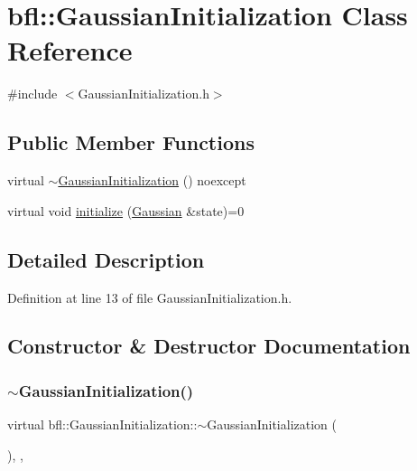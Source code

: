 \hypertarget{classbfl_1_1GaussianInitialization}{}\section{bfl\+:\+:Gaussian\+Initialization Class Reference}
\label{classbfl_1_1GaussianInitialization}


{\ttfamily \#include $<$Gaussian\+Initialization.\+h$>$}

\subsection*{Public Member Functions}
\begin{DoxyCompactItemize}
\item 
virtual \mbox{\hyperlink{classbfl_1_1GaussianInitialization_a4a0d53cdc9eaa19f263eeff489d0a437}{$\sim$\+Gaussian\+Initialization}} () noexcept
\item 
virtual void \mbox{\hyperlink{classbfl_1_1GaussianInitialization_ae1ef36cd233e10547778b3b339009c69}{initialize}} (\mbox{\hyperlink{classbfl_1_1Gaussian}{Gaussian}} \&state)=0
\end{DoxyCompactItemize}


\subsection{Detailed Description}


Definition at line 13 of file Gaussian\+Initialization.\+h.



\subsection{Constructor \& Destructor Documentation}
\mbox{\label{classbfl_1_1GaussianInitialization_a4a0d53cdc9eaa19f263eeff489d0a437}} 
\subsubsection{\texorpdfstring{$\sim$\+Gaussian\+Initialization()}{~GaussianInitialization()}}
{\footnotesize\ttfamily virtual bfl\+::\+Gaussian\+Initialization\+::$\sim$\+Gaussian\+Initialization (\begin{DoxyParamCaption}{ }\end{DoxyParamCaption})\hspace{0.3cm}{\ttfamily [inline]}, {\ttfamily [virtual]}, {\ttfamily [noexcept]}}



